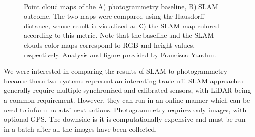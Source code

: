 \begin{figure}[H]
   \centering
   \\%
   \caption{Point cloud maps of the A) photogrammetry baseline, B) SLAM outcome. The two maps were compared using the Hausdorff distance, whose result is visualized as C) the SLAM map colored according to this metric. Note that the baseline and the SLAM clouds color maps correspond to RGB and height values, respectively. Analysis and figure provided by Francisco Yandun.}
   \label{fig:results:slam_photogrametry_comparison}
\end{figure}

We were interested in comparing the results of SLAM to photogrammetry because these two systems represent an interesting trade-off. SLAM approaches generally require multiple synchronized and calibrated sensors, with LiDAR being a common requirement. However, they can run in an online manner which can be used to inform robots' next actions. Photogrammetry requires only images, with optional GPS. The downside is it is computationally expensive and must be run in a batch after all the images have been collected.

